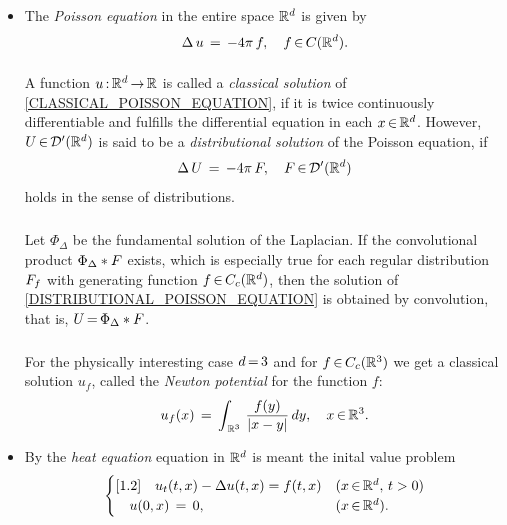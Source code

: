 \documentclass[11pt,twoside]{article}
\begin{document}
\begin{itemize}
\item[1.]
The \textit{Poisson equation} in the entire space ${\mathbb{R}}^d$ is given by
\begin{equation}\label{CLASSICAL_POISSON_EQUATION}
\Delta \, u \,=\, - 4\pi \,f, \quad f {\,\in\,} C({\mathbb{R}}^d).
\end{equation}

\paragraph{} %
A function $u {\,:\,}{\mathbb{R}}^d {\,\to\,} {\mathbb{R}}$ is called a \textit{classical solution}
of \eqref{CLASSICAL_POISSON_EQUATION},
if it is twice continuously differentiable
and fulfills the differential equation in each $x {\,\in\,} {\mathbb{R}}^d$.
However,
$U {\,\in\,} {\mathcal{D}}'({\mathbb{R}}^d)$ is said to be a \textit{distributional solution}
of the Poisson equation,
if
\begin{equation}\label{DISTRIBUTIONAL_POISSON_EQUATION}
\Delta \, U \,=\, - 4\pi \,F, \quad F {\,\in\,} {\mathcal{D}}'({\mathbb{R}}^d)
\end{equation}
holds in the sense of distributions.

\subparagraph{}
Let $\Phi_{\Delta}$ be the fundamental solution of the Laplacian.
If the convolutional product $\Phi_{\Delta} \ast F$ exists,
which is especially true for each regular distribution $F_f$
with generating function $f {\,\in\,} C_c({\mathbb{R}}^d)$,
then the solution of \eqref{DISTRIBUTIONAL_POISSON_EQUATION}
is obtained by convolution,
that is,
$U {\,=\,} \Phi_{\Delta} \ast F$.

\subparagraph{}
For the physically interesting case $d {\,=\,} 3$
and for $f {\,\in\,} C_c({\mathbb{R}}^3)$ we get a classical solution $u_f$,
called the \textit{Newton potential} for the function $f$:
\[
u_f(x) \=
\int_{\,\R^3} \, \frac{f(y)}{\abs{x-y } }  \, dy, \quad x \xeof \R^3.
\]

\item[2.]
By the \textit{heat equation} equation in ${\mathbb{R}}^d$ is meant
the inital value problem
\begin{equation}\label{CLASSICAL_HEAT_EQUATION}
\begin{cases}[1.2]
\quad u_t(t,x) - \Delta u(t,x) = f(t,x) & (x {\,\in\,} {\mathbb{R}}^d, \, t > 0) \\
\quad u(0,x) \,=\, 0,                      & (x {\,\in\,} {\mathbb{R}}^d). \\
\end{cases}
\end{equation}


\end{itemize}
\end{document}
